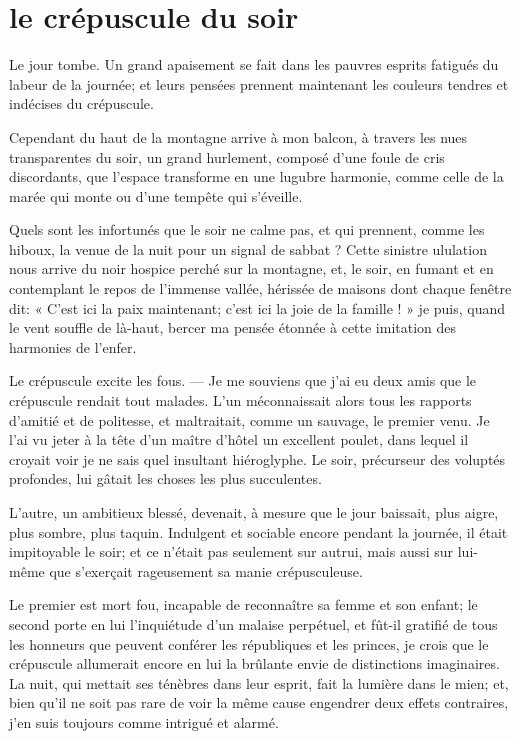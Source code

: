 \quebra\section[Le crépuscule du soir]{le crépuscule du soir}

Le jour tombe. Un grand apaisement se fait dans les pauvres esprits
fatigués du labeur de la journée; et leurs pensées prennent maintenant
les couleurs tendres et indécises du crépuscule.

Cependant du haut de la montagne arrive à mon balcon, à travers les nues
transparentes du soir, un grand hurlement, composé
d’une foule de cris discordants, que
l’espace transforme en une lugubre harmonie, comme
celle de la marée qui monte ou d’une tempête qui
s’éveille.

Quels sont les infortunés que le soir ne calme pas, et qui prennent,
comme les hiboux, la venue de la nuit pour un signal de sabbat ? Cette
sinistre ululation nous arrive du noir hospice perché sur la montagne,
et, le soir, en fumant et en contemplant le repos de
l’immense vallée, hérissée de maisons dont chaque
fenêtre dit: « C’est ici la paix maintenant;
c’est ici la joie de la famille ! » je puis, quand le
vent souffle de là{}-haut, bercer ma pensée étonnée à cette imitation
des harmonies de l’enfer.

Le crépuscule excite les fous. --- Je me souviens que
j’ai eu deux amis que le crépuscule rendait tout
malades. L’un méconnaissait alors tous les rapports
d’amitié et de politesse, et maltraitait, comme un
sauvage, le premier venu. Je l’ai vu jeter à la tête
d’un maître d’hôtel un excellent
poulet, dans lequel il croyait voir je ne sais quel insultant
hiéroglyphe. Le soir, précurseur des voluptés profondes, lui gâtait les
choses les plus succulentes.

L’autre, un ambitieux blessé, devenait, à mesure que le
jour baissait, plus aigre, plus sombre, plus taquin. Indulgent et
sociable encore pendant la journée, il était impitoyable le soir; et ce
n’était pas seulement sur autrui, mais aussi sur
lui{}-même que s’exerçait rageusement sa manie
crépusculeuse.

Le premier est mort fou, incapable de reconnaître sa femme et son
enfant; le second porte en lui l’inquiétude
d’un malaise perpétuel, et fût{}-il gratifié de tous
les honneurs que peuvent conférer les républiques et les princes, je
crois que le crépuscule allumerait encore en lui la brûlante envie de
distinctions imaginaires. La nuit, qui mettait ses ténèbres dans leur
esprit, fait la lumière dans le mien; et, bien qu’il
ne soit pas rare de voir la même cause engendrer deux effets
contraires, j’en suis toujours comme intrigué et
alarmé.

